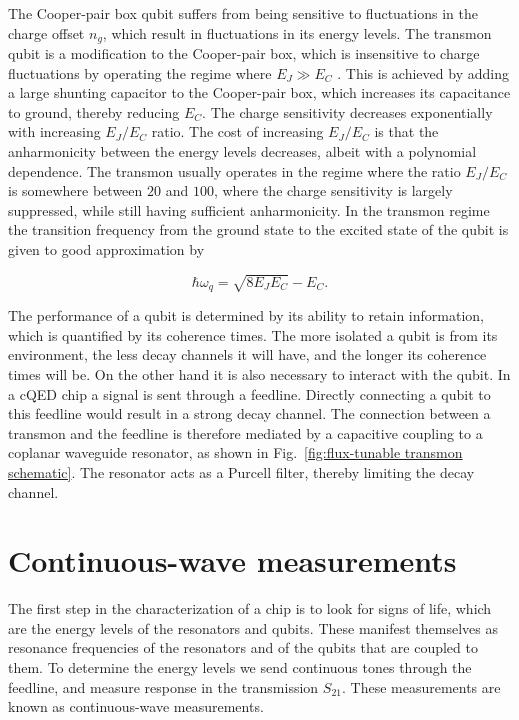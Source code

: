       The Cooper-pair box qubit suffers from being sensitive to fluctuations in the charge offset $n_g$, which result in fluctuations in its energy levels. The transmon qubit is a modification to the Cooper-pair box, which is insensitive to charge fluctuations by operating the regime where $E_J \gg E_C$ \cite{koch2007Transmon,schreier2008suppressing}. This is achieved by adding a large shunting capacitor to the Cooper-pair box, which increases its capacitance to ground, thereby reducing $E_C$. The charge sensitivity decreases exponentially with increasing $E_J/E_C$ ratio. The cost of increasing $E_J/E_C$ is that the anharmonicity between the energy levels decreases, albeit with a polynomial dependence. The transmon usually operates in the regime where the ratio $E_J/E_C$ is somewhere between $20$ and $100$, where the charge sensitivity is largely suppressed, while still having sufficient anharmonicity. In the transmon regime the transition frequency from the ground state to the excited state of the qubit is given to good approximation by \cite[p.52]{Reed}

      \begin{equation}
        \hbar \omega_q = \sqrt{8 E_J E_C} - E_C.
        \label{eq:transmon frequency}
      \end{equation}

      The performance of a qubit is determined by its ability to retain information, which is quantified by its coherence times. The more isolated a qubit is from its environment, the less decay channels it will have, and the longer its coherence times will be. On the other hand it is also necessary to interact with the qubit. In a cQED chip a signal is sent through a feedline. Directly connecting a qubit to this feedline would result in a strong decay channel. The connection between a transmon and the feedline is therefore mediated by a capacitive coupling to a coplanar waveguide resonator, as shown in Fig.~\ref{fig:flux-tunable transmon schematic}. The resonator acts as a Purcell filter, thereby limiting the decay channel.

    \section{Continuous-wave measurements}
      \label{sec:Continuous-wave measurements}
      The first step in the characterization of a chip is to look for signs of life, which are the energy levels of the resonators and qubits. These manifest themselves as resonance frequencies of the resonators and of the qubits that are coupled to them. To determine the energy levels we send continuous tones through the feedline, and measure response in the transmission $S_{21}$. These measurements are known as continuous-wave measurements.

